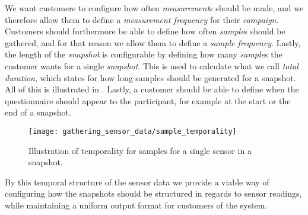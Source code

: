 We want customers to configure how often \emph{measurement}s should be made, and we therefore allow them to define a \emph{measurement frequency} for their \emph{campaign}. Customers should furthermore be able to define how often \emph{sample}s should be gathered, and for that reason we allow them to define a \emph{sample frequency}. Lastly, the length of the \emph{snapshot} is configurable by defining how many \emph{sample}s the customer wants for a single \emph{snapshot}. This is used to calculate what we call \emph{total duration}, which states for how long samples should be generated for a snapshot. All of this is illustrated in . Lastly, a customer should be able to define when the questionnaire should appear to the participant, for example at the start or the end of a snapshot.

\begin{figure}[!htbp]
    \centering
    \texttt{[image: gathering\_sensor\_data/sample\_temporality]}
    \caption{Illustration of temporality for samples for a single sensor in a snapshot.}
    \label{fig:sample_temporality}
\end{figure}
\FloatBarrier

By this temporal structure of the sensor data we provide a viable way of configuring how the snapshots should be structured in regards to sensor readings, while maintaining a uniform output format for customers of the system.
